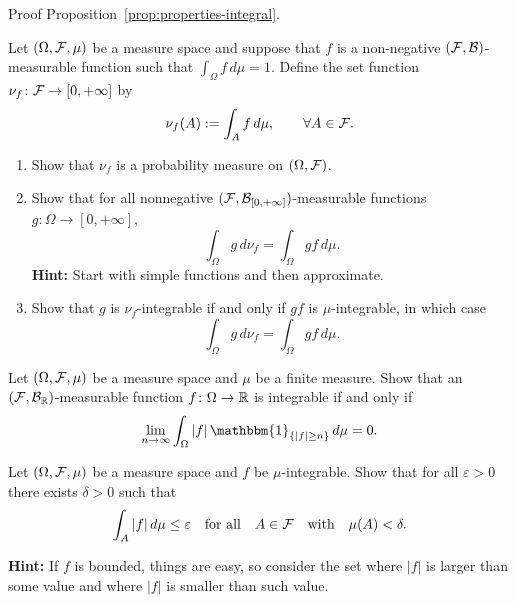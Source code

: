 \begin{problem}\label{prb:lebesgue_integral_general}
Proof Proposition~\ref{prop:properties-integral}.
\end{problem}

\begin{problem}\label{prb:measure}
	Let $(\Omega,\mathcal F,\mu)$ be a measure space and suppose that $f$ is a non-negative $(\mathcal F,\mathcal B)$-measurable function such that $\int_\Omega f\,d\mu=1$. Define the set function $\nu_f\colon\mathcal F\to[0,+\infty]$ by
	\[
		\nu_f(A):=\int_A f\,d\mu,\qquad \forall A\in\mathcal F.
	\]
	\begin{enumerate}[label=(\alph*)]
		\item Show that $\nu_f$ is a probability measure on $(\Omega,\mathcal F)$.
		\item Show that for all nonnegative $(\mathcal F,\mathcal B_{[0,+\infty]})$-measurable functions $g\colon\Omega\to [0,+\infty]$,
		\[
			\int_\Omega g\, d\nu_f = \int_\Omega g f\,d\mu.
		\]
		\textbf{Hint:} Start with simple functions and then approximate.
		\item Show that $g$ is $\nu_f$-integrable if and only if $g f$ is $\mu$-integrable, in which case
		\[
			\int_\Omega g\,d\nu_f = \int_\Omega g f\,d\mu.
		\]
	\end{enumerate}
\end{problem}


\begin{problem}
	Let $(\Omega,\mathcal F,\mu)$ be a measure space and $\mu$ be a finite measure. Show that an $(\mathcal F,\mathcal B_{\mathbb R})$-measurable function $f\colon\Omega\to \mathbb R$ is integrable if and only if
	\[
		\lim_{n\to\infty}\int_\Omega |f|\,\mathbbm{1}_{\{|f|\ge n\}}\,d\mu = 0.
	\]
\end{problem}


\begin{problem}
	Let $(\Omega,\mathcal F,\mu)$ be a measure space and $f$ be $\mu$-integrable. Show that for all $\varepsilon>0$ there exists $\delta>0$ such that
	\[
		\int_A |f|\,d\mu\le \varepsilon\quad \text{for all}\quad A\in\mathcal F\quad \text{with}\quad \mu(A)<\delta.
	\]
	
\smallskip
	
	\noindent\textbf{Hint:} If $f$ is bounded, things are easy, so consider the set where $|f|$ is larger than some value and where $|f|$ is smaller than such value.
\end{problem}



